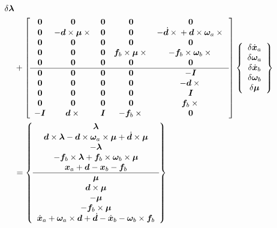 \documentclass[10pt,fleqn,subeqn]{report}
\newcommand{\T}[1]{\bm{#1}}
\begin{document}
\begin{align}
{{		\delta\T{\lambda}
	}} \nonumber \\
	&+ \sqbr{\matr{ccccc}{
		\T{0} & \T{0} & \T{0} & \T{0} & \T{0} \\ 	%
		\T{0} & -\T{d}\times\T{\mu}\times{} &
			\T{0} & \T{0} & 
			- \dot{\T{d}}\times{}
			+ \T{d}\times\T{\omega}_a\times{} \\	%
		\T{0} & \T{0} & \T{0} & \T{0} & \T{0} \\	%
		\T{0} & \T{0} & \T{0} & \T{f}_b\times\T{\mu}\times{} &
			-\T{f}_b\times\T{\omega}_b\times{} \\	%
		\T{0} & \T{0} & \T{0} & \T{0} & \T{0} \\	%
%
	\hline
		\T{0} & \T{0} & \T{0} & \T{0} & -\T{I} \\	%
		\T{0} & \T{0} &
			\T{0} & \T{0} & -\T{d}\times{} \\	%
		\T{0} & \T{0} & \T{0} & \T{0} & \T{I} \\	%
		\T{0} & \T{0} & \T{0} & \T{0} &
			\T{f}_b\times{} \\	%
		-\T{I} & \T{d}\times{} & \T{I} & -\T{f}_b\times{} &
			\T{0} 					%
	}} \cubr{\cvvect{
		\delta\dot{\T{x}}_a \\
		\delta\T{\omega}_a \\
		\delta\dot{\T{x}}_b \\
		\delta\T{\omega}_b \\
		\delta\T{\mu}
	}} \nonumber \\
	&= \cubr{\cvvect{
		\T{\lambda} \\
		\T{d}\times\T{\lambda}
			- \T{d}\times\T{\omega}_a\times\T{\mu}
			+ \dot{\T{d}}\times\T{\mu} \\
		-\T{\lambda} \\
		-\T{f}_b\times\T{\lambda}
			+ \T{f}_b\times\T{\omega}_b\times\T{\mu} \\
		\T{x}_a + \T{d} - \T{x}_b - \T{f}_b \\
%
		\hline
		\T{\mu} \\
		\T{d}\times\T{\mu} \\
		-\T{\mu} \\
		-\T{f}_b\times\T{\mu} \\
		\dot{\T{x}}_a + \T{\omega}_a\times\T{d} + \dot{\T{d}}
			- \dot{\T{x}}_b - \T{\omega}_b\times\T{f}_b
	}}
\end{align}
\end{document}
